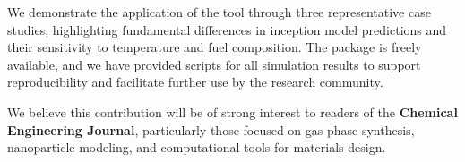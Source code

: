 \begin{titlepage}
	We demonstrate the application of the tool through three representative case studies, highlighting fundamental differences in inception model predictions and their sensitivity to temperature and fuel composition. The package is freely available, and we have provided scripts for all simulation results to support reproducibility and facilitate further use by the research community.
	
	We believe this contribution will be of strong interest to readers of the \textbf{Chemical Engineering Journal}, particularly those focused on gas-phase synthesis, nanoparticle modeling, and computational tools for materials design.
	
	
%	
%	
%	
	

\end{titlepage}
